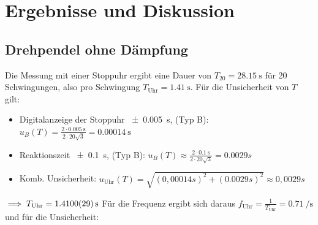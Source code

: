 \documentclass[
	a4paper,
	12pt,
	pagesize,
	ngerman
]{scrartcl}
\begin{document}
	\section{Ergebnisse und Diskussion}
	
	\subsection{Drehpendel ohne Dämpfung}
	Die Messung mit einer Stoppuhr ergibt eine Dauer von $T_20 =\SI{28,15}{\second}$ für 20 Schwingungen, also pro Schwingung $ T_\text{Uhr} = \SI{1,41}{\second}$. %
	Für die Unsicherheit von \(T\) gilt: \\
	\begin{itemize}
		\item  Digitalanzeige der Stoppuhr \SI{\pm 0,005}{\second}, (Typ B): \( u_B(T) = \frac{2\cdot \SI{0,005}{\second}}{2 \cdot 20 \sqrt{3}} = \SI{0,00014}{\second} \)
		\item Reaktionszeit \SI{\pm 0,1}{\second}, (Typ B): \( u_B(T) \approx \frac{2\cdot \SI{0,1}{\second}}{2 \cdot 20 \sqrt{3}} = 0.0029\si{s} \)
		\item Komb. Unsicherheit: $ u_\text{Uhr}(T) = \sqrt{(0,00014\si{s})^2+(0.0029\si{s})^2} \approx 0,0029 \si{s} $
	\end{itemize} 
	$ \implies T_\text{Uhr} = \SI{1,41 \pm 0,0029}{\second} $ \newline 
	Für die Frequenz ergibt sich daraus $ f_\text{Uhr} = \frac{1}{T_\text{Uhr}} = \SI{0,71}{\per \second}$ und für die Unsicherheit: \newline
	
\end{document}
